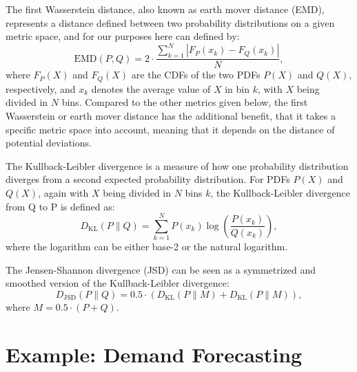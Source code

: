 \documentclass[BCOR=1mm, DIV=calc,10pt,
twoside=true,
twocolumn,
headings=normal]{scrartcl}
\begin{document}
The first Wasserstein distance, also known as earth mover distance (EMD), represents a distance  defined between two probability distributions on a given metric space, and for our purposes here can defined by:
\begin{equation}
\text{EMD}(P, Q) = 2 \cdot \frac{\sum_{k=1}^N |F_P(x_k) - F_Q(x_k)|}{N},
\end{equation}
where $F_P(X)$ and $F_Q(X)$ are the CDFs of the two PDFs $P(X)$ and $Q(X)$, respectively, and $x_k$ denotes the average value of $X$ in bin $k$, with $X$ being divided in $N$ bins. Compared to the other metrics given below, the first Wasserstein or earth mover distance has the additional benefit, that it takes a specific metric space into account, meaning that it depends on the distance of potential deviations.

The Kullback-Leibler divergence is a measure of how one probability distribution diverges from a second expected probability distribution. For PDFs $P(X)$ and $Q(X)$, again with $X$ being divided in $N$ bins $k$, the Kullback-Leibler divergence from Q to P is defined as:
\begin{equation}
D_{\text{KL}}(P \parallel Q) = \sum _{k=1}^N P(x_k) \log \left({\frac{P(x_k)}{Q(x_k)}}\right),
\end{equation}
where the logarithm can be either base-2 or the natural logarithm.

The Jensen-Shannon divergence (JSD) can be seen as a symmetrized and smoothed version of the Kullback-Leibler divergence:
\begin{equation}
D_{\text{JSD}}(P \parallel Q) = 0.5  \cdot (D_{\text{KL}}(P \parallel M) + D_{\text{KL}}(P \parallel M)),
\end{equation}
where $M = 0.5  \cdot (P + Q)$.


\section{Example: Demand Forecasting}
\label{sec:example}
\end{document}
